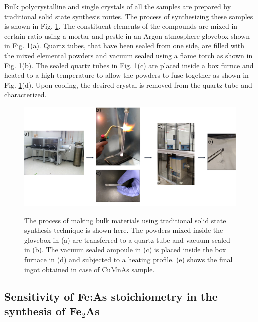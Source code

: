 \documentclass[10pt,doublespacing,edeposit]{uiucthesis2020}
\begin{document}
\begin{mainmatter}


Bulk polycrystalline and single crystals of all the samples are prepared by traditional solid state synthesis routes. The process of synthesizing these samples is shown in Fig. \ref{fig:synthesis_procedure}. The constituent elements of the compounds are mixed in certain ratio using a mortar and pestle in an Argon atmosphere glovebox shown in Fig. \ref{fig:synthesis_procedure}(a). Quartz tubes, that have been sealed from one side, are filled with the mixed elemental powders and vacuum sealed using a flame torch as shown in Fig. \ref{fig:synthesis_procedure}(b). The sealed quartz tubes in Fig. \ref{fig:synthesis_procedure}(c) are placed inside a box furnce and heated to a high temperature to allow the powders to fuse together as shown in Fig. \ref{fig:synthesis_procedure}(d). Upon cooling, the desired crystal is removed from the quartz tube and characterized.

\begin{figure}
\centering\includegraphics[width=\columnwidth]{figures/ch3/synthesis_procedure.png} \\
\caption{\label{fig:synthesis_procedure}
The process of making bulk materials using traditional solid state synthesis technique is shown here. The powders mixed inside the glovebox in (a) are transferred to a quartz tube and vacuum sealed in (b). The vacuum sealed ampoule in (c) is placed inside the box furnace in (d) and subjected to a heating profile. (e) shows the final ingot obtained in case of CuMnAs sample.
}
\end{figure}



\subsection{Sensitivity of Fe:As stoichiometry in the synthesis of Fe$_2$As}


\end{mainmatter}
\end{document}
